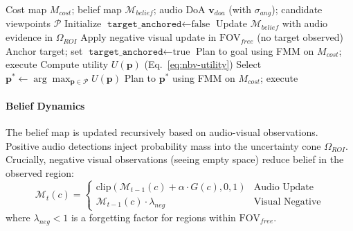 \begin{algorithm}[t]
    \caption{Belief-Driven Active Search (Search--Then--Go)}
    \label{alg:active-search}
    \begin{algorithmic}[1]
        \REQUIRE Cost map \(M_{cost}\); belief map \(\mathcal{M}_{belief}\); audio DoA \(\mathbf{v}_{doa}\) (with \(\sigma_{ang}\)); candidate viewpoints \(\mathcal{P}\)
        \STATE Initialize \(\texttt{target\_anchored} \leftarrow \text{false}\)
            \STATE Update \(\mathcal{M}_{belief}\) with audio evidence in \(\Omega_{ROI}\)
            \STATE Apply negative visual update in \(\text{FOV}_{free}\) (no target observed)
                \STATE Anchor target; set \(\texttt{target\_anchored} \leftarrow \text{true}\)
            \ENDIF
                \STATE Plan to goal using FMM on \(M_{cost}\); execute
            \ELSE
                    \STATE Compute utility \(U(\mathbf{p})\) (Eq.~\ref{eq:nbv-utility})
                \ENDFOR
                \STATE Select \(\mathbf{p}^* \leftarrow \arg\max_{\mathbf{p} \in \mathcal{P}} U(\mathbf{p})\)
                \STATE Plan to \(\mathbf{p}^*\) using FMM on \(M_{cost}\); execute
            \ENDIF
        \ENDWHILE
    \end{algorithmic}
\end{algorithm}

\paragraph{Belief Dynamics} The belief map is updated recursively based on audio-visual observations. Positive audio detections inject probability mass into the uncertainty cone \(\Omega_{ROI}\). Crucially, negative visual observations (seeing empty space) reduce belief in the observed region:
\begin{equation}
    \mathcal{M}_{t}(c) = \begin{cases}
        \text{clip}(\mathcal{M}_{t-1}(c) + \alpha \cdot G(c), 0, 1) & \text{Audio Update} \\
        \mathcal{M}_{t-1}(c) \cdot \lambda_{neg} & \text{Visual Negative}
    \end{cases}
\end{equation}
where \(\lambda_{neg} < 1\) is a forgetting factor for regions within \(\text{FOV}_{free}\).

